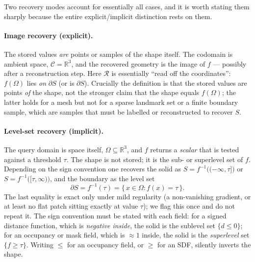 Two recovery modes account for essentially all cases, and it is worth stating them
sharply because the entire explicit/implicit distinction rests on them.

\paragraph{Image recovery (explicit).} The stored values \emph{are} points or samples
of the shape itself. The codomain is ambient space, $\mathcal{C} = \mathbb{R}^3$, and
the recovered geometry is the image of $f$ --- possibly after a reconstruction step.
Here $\mathcal{R}$ is essentially ``read off the coordinates'': $f(\Omega)$ lies
\emph{on} $\partial S$ (or is $\partial S$). Crucially the definition is that the
stored values are points \emph{of} the shape, not the stronger claim that the shape
equals $f(\Omega)$; the latter holds for a mesh but not for a sparse landmark set or a
finite boundary sample, which are samples that must be labelled or reconstructed to
recover $S$.

\paragraph{Level-set recovery (implicit).} The query domain is space itself,
$\Omega \subseteq \mathbb{R}^3$, and $f$ returns a \emph{scalar} that is tested
against a threshold $\tau$. The shape is not stored; it is the sub- or superlevel set
of $f$. Depending on the sign convention one recovers the solid as
$S = f^{-1}\big((-\infty,\tau]\big)$ or $S = f^{-1}\big([\tau,\infty)\big)$, and the
boundary as the level set
\[
    \partial S = f^{-1}(\tau) = \{\, x \in \Omega : f(x) = \tau \,\}.
\]
The last equality is exact only under mild regularity (a non-vanishing gradient, or at
least no flat patch sitting exactly at value $\tau$); we flag this once and do not
repeat it. The sign convention must be stated with each field: for a signed distance
function, which is \emph{negative inside}, the solid is the sublevel set $\{d \le 0\}$;
for an occupancy or mask field, which is $\approx 1$ inside, the solid is the
\emph{superlevel} set $\{f \ge \tau\}$. Writing $\le$ for an occupancy field, or $\ge$
for an SDF, silently inverts the shape.


